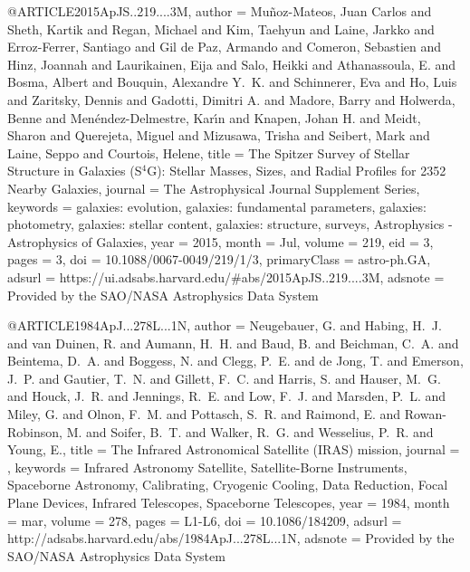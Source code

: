 \documentclass[longauth]{aa}
\begin{document}
{@ARTICLE{2015ApJS..219....3M,
       author = {{Mu{\~n}oz-Mateos}, Juan Carlos and {Sheth}, Kartik and {Regan}, Michael and {Kim}, Taehyun and {Laine}, Jarkko and {Erroz-Ferrer}, Santiago and {Gil de Paz}, Armando and {Comeron}, Sebastien and {Hinz}, Joannah and {Laurikainen}, Eija and {Salo}, Heikki and {Athanassoula}, E. and {Bosma}, Albert and {Bouquin}, Alexandre Y.~K. and {Schinnerer}, Eva and {Ho}, Luis and {Zaritsky}, Dennis and {Gadotti}, Dimitri A. and {Madore}, Barry and {Holwerda}, Benne and {Men{\'e}ndez-Delmestre}, Kar{\'\i}n and {Knapen}, Johan H. and {Meidt}, Sharon and {Querejeta}, Miguel and {Mizusawa}, Trisha and {Seibert}, Mark and {Laine}, Seppo and {Courtois}, Helene},
        title = {The Spitzer Survey of Stellar Structure in Galaxies (S$^{4}$G): Stellar Masses, Sizes, and Radial Profiles for 2352 Nearby Galaxies},
      journal = {The Astrophysical Journal Supplement Series},
     keywords = {galaxies: evolution, galaxies: fundamental parameters, galaxies: photometry, galaxies: stellar content, galaxies: structure, surveys, Astrophysics - Astrophysics of Galaxies},
         year = 2015,
        month = Jul,
       volume = {219},
          eid = {3},
        pages = {3},
          doi = {10.1088/0067-0049/219/1/3},
 primaryClass = {astro-ph.GA},
       adsurl = {https://ui.adsabs.harvard.edu/#abs/2015ApJS..219....3M},
      adsnote = {Provided by the SAO/NASA Astrophysics Data System}
}

@ARTICLE{1984ApJ...278L...1N,
   author = {{Neugebauer}, G. and {Habing}, H.~J. and {van Duinen}, R. and {Aumann}, H.~H. and {Baud}, B. and {Beichman}, C.~A. and {Beintema}, D.~A. and {Boggess}, N. and {Clegg}, P.~E. and {de Jong}, T. and {Emerson}, J.~P. and {Gautier}, T.~N. and {Gillett}, F.~C. and {Harris}, S. and {Hauser}, M.~G. and {Houck}, J.~R. and {Jennings}, R.~E. and {Low}, F.~J. and {Marsden}, P.~L. and {Miley}, G. and {Olnon}, F.~M. and {Pottasch}, S.~R. and {Raimond}, E. and {Rowan-Robinson}, M. and {Soifer}, B.~T. and {Walker}, R.~G. and {Wesselius}, P.~R. and {Young}, E.},
    title = {The Infrared Astronomical Satellite (IRAS) mission},
  journal = {\apjl},
 keywords = {Infrared Astronomy Satellite, Satellite-Borne Instruments, Spaceborne Astronomy, Calibrating, Cryogenic Cooling, Data Reduction, Focal Plane Devices, Infrared Telescopes, Spaceborne Telescopes},
     year = 1984,
    month = mar,
   volume = 278,
    pages = {L1-L6},
      doi = {10.1086/184209},
   adsurl = {http://adsabs.harvard.edu/abs/1984ApJ...278L...1N},
  adsnote = {Provided by the SAO/NASA Astrophysics Data System}
}

}
\end{document}
